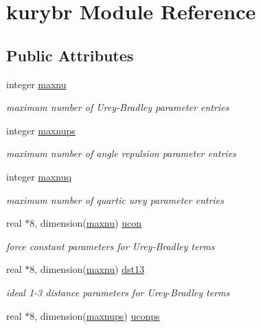 \hypertarget{classkurybr}{\section{kurybr Module Reference}
\label{classkurybr}
}
\subsection*{Public Attributes}
\begin{DoxyCompactItemize}
\item 
integer \hyperlink{classkurybr_aaf30bd9a13addd363c837108f12933ca}{maxnu}
\begin{DoxyCompactList}\small\item\em maximum number of Urey-\/\-Bradley parameter entries \end{DoxyCompactList}\item 
integer \hyperlink{classkurybr_a0985b078f790810fc48fafe9ae7732df}{maxnups}
\begin{DoxyCompactList}\small\item\em maximum number of angle repulsion parameter entries \end{DoxyCompactList}\item 
integer \hyperlink{classkurybr_a3e8676e31b4829ad722f50e1130d3744}{maxnuq}
\begin{DoxyCompactList}\small\item\em maximum number of quartic urey parameter entries \end{DoxyCompactList}\item 
real $\ast$8, dimension(\hyperlink{classkurybr_aaf30bd9a13addd363c837108f12933ca}{maxnu}) \hyperlink{classkurybr_ad5d1c061d42d5c928e1963e4d7ada287}{ucon}
\begin{DoxyCompactList}\small\item\em force constant parameters for Urey-\/\-Bradley terms \end{DoxyCompactList}\item 
real $\ast$8, dimension(\hyperlink{classkurybr_aaf30bd9a13addd363c837108f12933ca}{maxnu}) \hyperlink{classkurybr_ad04267e2ab89ff58d358e0c438293a9c}{dst13}
\begin{DoxyCompactList}\small\item\em ideal 1-\/3 distance parameters for Urey-\/\-Bradley terms \end{DoxyCompactList}\item 
real $\ast$8, dimension(\hyperlink{classkurybr_a0985b078f790810fc48fafe9ae7732df}{maxnups}) \hyperlink{classkurybr_af7890bc737d1d919995652c218c7979a}{uconps}

\end{DoxyCompactItemize}
